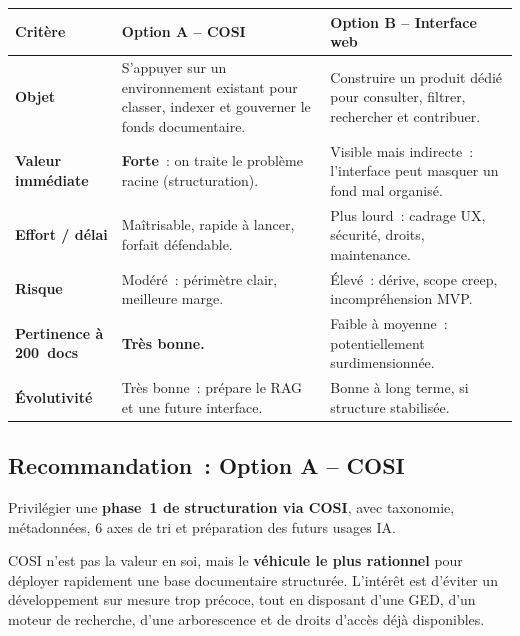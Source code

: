 \documentclass[12pt, a4paper]{article}
\begin{document}
\begin{center}
\renewcommand{\arraystretch}{1.4}
\begin{tabularx}{\textwidth}{>{\bfseries\small}l X X}
\toprule
\textbf{\textcolor{bleuprofond}{Critère}} & \textbf{\textcolor{bleuprofond}{Option A -- COSI}} & \textbf{\textcolor{bleuprofond}{Option B -- Interface web}} \\
\midrule
Objet & S'appuyer sur un environnement existant pour classer, indexer et gouverner le fonds documentaire. & Construire un produit dédié pour consulter, filtrer, rechercher et contribuer. \\
\midrule
Valeur immédiate & \textcolor{vert}{\textbf{Forte}}~: on traite le problème racine (structuration). & Visible mais indirecte~: l'interface peut masquer un fond mal organisé. \\
\midrule
Effort / délai & Maîtrisable, rapide à lancer, forfait défendable. & Plus lourd~: cadrage UX, sécurité, droits, maintenance. \\
\midrule
Risque & Modéré~: périmètre clair, meilleure marge. & Élevé~: dérive, scope creep, incompréhension MVP. \\
\midrule
Pertinence à 200~docs & \textcolor{vert}{\textbf{Très bonne.}} & Faible à moyenne~: potentiellement surdimensionnée. \\
\midrule
Évolutivité & Très bonne~: prépare le RAG et une future interface. & Bonne à long terme, si structure stabilisée. \\
\bottomrule
\end{tabularx}
\end{center}

\subsection{Recommandation~: Option A -- COSI}

\begin{keybox}
Privilégier une \textbf{phase~1 de structuration via COSI}, avec taxonomie, métadonnées, 6 axes de tri et préparation des futurs usages IA.

\medskip

COSI n'est pas la valeur en soi, mais le \textbf{véhicule le plus rationnel} pour déployer rapidement une base documentaire structurée. L'intérêt est d'éviter un développement sur mesure trop précoce, tout en disposant d'une GED, d'un moteur de recherche, d'une arborescence et de droits d'accès déjà disponibles.
\end{keybox}
\end{document}
